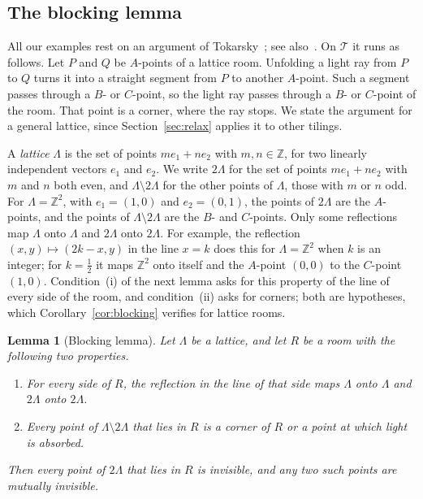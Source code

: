 \documentclass[11pt,a4paper]{article}
\theoremstyle{plain}
\newtheorem{lemma}[theorem]{Lemma}
\theoremstyle{definition}
\theoremstyle{remark}
\newcommand{\Z}{\mathbb{Z}}
\newcommand{\T}{\mathcal{T}}
\numberwithin{equation}{section}
\begin{document}
\subsection{The blocking lemma}
All our examples rest on an argument of Tokarsky~\cite[Lemma~3.1 and Theorem~3.2]{Tok95}; see also~\cite[Corollary]{TB}. On $\T$ it runs as follows. Let $P$ and $Q$ be $A$-points of a lattice room. Unfolding a light ray from $P$ to $Q$ turns it into a straight segment from $P$ to another $A$-point. Such a segment passes through a $B$- or $C$-point, so the light ray passes through a $B$- or $C$-point of the room. That point is a corner, where the ray stops. We state the argument for a general lattice, since Section~\ref{sec:relax} applies it to other tilings.

A \emph{lattice} $\Lambda$ is the set of points $me_1+ne_2$ with $m,n\in\Z$, for two linearly independent vectors $e_1$ and $e_2$. We write $2\Lambda$ for the set of points $me_1+ne_2$ with $m$ and $n$ both even, and $\Lambda\setminus2\Lambda$ for the other points of $\Lambda$, those with $m$ or $n$ odd. For $\Lambda=\Z^2$, with $e_1=(1,0)$ and $e_2=(0,1)$, the points of $2\Lambda$ are the $A$-points, and the points of $\Lambda\setminus2\Lambda$ are the $B$- and $C$-points. Only some reflections map $\Lambda$ onto $\Lambda$ and $2\Lambda$ onto $2\Lambda$. For example, the reflection $(x,y)\mapsto(2k-x,y)$ in the line $x=k$ does this for $\Lambda=\Z^2$ when $k$ is an integer; for $k=\frac12$ it maps $\Z^2$ onto itself and the $A$-point $(0,0)$ to the $C$-point $(1,0)$. Condition~(i) of the next lemma asks for this property of the line of every side of the room, and condition~(ii) asks for corners; both are hypotheses, which Corollary~\ref{cor:blocking} verifies for lattice rooms.

\begin{lemma}[Blocking lemma]\label{lem:blocking}
Let $\Lambda$ be a lattice, and let $R$ be a room with the following two properties.
\begin{enumerate}[label=\textup{(\roman*)}]
\item For every side of $R$, the reflection in the line of that side maps $\Lambda$ onto $\Lambda$ and $2\Lambda$ onto $2\Lambda$.
\item Every point of $\Lambda\setminus2\Lambda$ that lies in $R$ is a corner of $R$ or a point at which light is absorbed.
\end{enumerate}
Then every point of $2\Lambda$ that lies in $R$ is invisible, and any two such points are mutually invisible.
\end{lemma}
\end{document}
